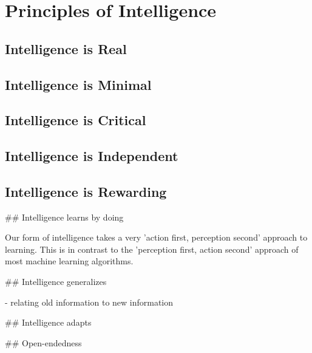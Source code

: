 \section{Principles of Intelligence}

\subsection{Intelligence is Real}

\subsection*{Intelligence is Minimal}

\subsection*{Intelligence is Critical}

\subsection*{Intelligence is Independent}

\subsection*{Intelligence is Rewarding}




\#\# Intelligence learns by doing

Our form of intelligence takes a very 'action first, perception second' approach to learning. This is in contrast to the 'perception first, action second' approach of most machine learning algorithms.


\#\# Intelligence generalizes

- relating old information to new information

\#\# Intelligence adapts


\#\# Open-endedness